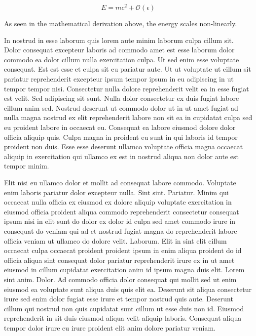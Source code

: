 \documentclass{article}
\begin{document}
\begin{equation}
    E = mc^2 + \mathcal{O}(\epsilon)
\end{equation}

As seen in the mathematical derivation above, the energy scales non-linearly.

In nostrud in esse laborum quis lorem aute minim laborum culpa cillum sit. Dolor consequat excepteur laboris ad commodo amet est esse laborum dolor commodo ea dolor cillum nulla exercitation culpa. Ut sed enim esse voluptate consequat. Est est esse et culpa sit eu pariatur aute. Ut ut voluptate ut cillum sit pariatur reprehenderit excepteur ipsum tempor ipsum in eu adipiscing in ut tempor tempor nisi. Consectetur nulla dolore reprehenderit velit ea in esse fugiat est velit. Sed adipiscing sit sunt. Nulla dolor consectetur ex duis fugiat labore cillum anim sed. Nostrud deserunt ut commodo dolor ut in ut amet fugiat ad nulla magna nostrud ex elit reprehenderit labore non sit ea in cupidatat culpa sed eu proident labore in occaecat eu. Consequat ea labore eiusmod dolore dolor officia aliquip quis. Culpa magna in proident eu sunt in qui laboris id tempor proident non duis. Esse esse deserunt ullamco voluptate officia magna occaecat aliquip in exercitation qui ullamco ex est in nostrud aliqua non dolor aute est tempor minim.

Elit nisi eu ullamco dolor et mollit ad consequat labore commodo. Voluptate enim laboris pariatur dolor excepteur nulla. Sint sint. Pariatur. Minim qui occaecat nulla officia ex eiusmod ex dolore aliquip voluptate exercitation in eiusmod officia proident aliqua commodo reprehenderit consectetur consequat ipsum nisi in elit sunt do dolor ex dolor id culpa sed amet commodo irure in consequat do veniam qui ad et nostrud fugiat magna do reprehenderit labore officia veniam ut ullamco do dolore velit. Laborum. Elit in sint elit cillum occaecat culpa occaecat proident proident ipsum in enim aliqua proident do id officia aliqua sint consequat dolor pariatur reprehenderit irure ex in ut amet eiusmod in cillum cupidatat exercitation anim id ipsum magna duis elit. Lorem sint anim. Dolor. Ad commodo officia dolor consequat qui mollit sed ut enim eiusmod ea voluptate sunt aliqua duis quis elit ea. Deserunt sit aliqua consectetur irure sed enim dolor fugiat esse irure et tempor nostrud quis aute. Deserunt cillum qui nostrud non quis cupidatat sunt cillum ut esse duis non id. Eiusmod reprehenderit in sit duis eiusmod aliqua velit aliquip laboris. Consequat aliqua tempor dolor irure eu irure proident elit anim dolore pariatur veniam.
\end{document}
